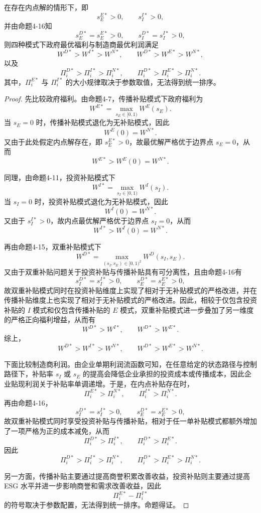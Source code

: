 \begin{proposition}[内点解情形下的福利与利润比较]
在存在内点解的情形下，即
\[
s_E^{E*}>0,\qquad s_I^{I*}>0,
\]
并由命题4-16知
\[
s_E^{D*}=s_E^{E*}>0,\qquad s_I^{D*}=s_I^{I*}>0,
\]
则四种模式下政府最优福利与制造商最优利润满足
\[
W^{D*}>W^{I*}>W^{N*},\qquad
W^{D*}>W^{E*}>W^{N*},
\]
以及
\[
\Pi_i^{D*}>\Pi_i^{I*}>\Pi_i^{N*},\qquad
\Pi_i^{D*}>\Pi_i^{E*}>\Pi_i^{N*}.
\]
其中，\(\Pi_i^{E*}\) 与 \(\Pi_i^{I*}\) 的大小规律取决于参数取值，无法得到统一排序。
\end{proposition}

\begin{proof}
先比较政府福利。由命题4-7，传播补贴模式下政府福利为
\[
W^{E*}=\max_{s_E\in[0,1)}W^E(s_E).
\]
当 \(s_E=0\) 时，传播补贴模式退化为无补贴模式，因此
\[
W^E(0)=W^{N*}.
\]
又由于此处假定内点解存在，即 \(s_E^{E*}>0\)，故最优解严格优于边界点 \(s_E=0\)，从而
\[
W^{E*}>W^E(0)=W^{N*}.
\]

同理，由命题4-11，投资补贴模式下
\[
W^{I*}=\max_{s_I\in[0,1)}W^I(s_I).
\]
当 \(s_I=0\) 时，投资补贴模式退化为无补贴模式，因此
\[
W^I(0)=W^{N*}.
\]
又由于 \(s_I^{I*}>0\)，故内点最优解严格优于边界点 \(s_I=0\)，从而
\[
W^{I*}>W^I(0)=W^{N*}.
\]

再由命题4-15，双重补贴模式下
\[
W^{D*}=\max_{(s_I,s_E)\in[0,1)^2}W^D(s_I,s_E).
\]
又由于双重补贴问题关于投资补贴与传播补贴具有可分离性，且由命题4-16有
\[
s_I^{D*}=s_I^{I*}>0,\qquad s_E^{D*}=s_E^{E*}>0,
\]
故双重补贴模式同时在投资补贴维度上实现了相对于无补贴模式的严格改进，并在传播补贴维度上也实现了相对于无补贴模式的严格改进。因此，相较于仅包含投资补贴的 \(I\) 模式和仅包含传播补贴的 \(E\) 模式，双重补贴模式进一步叠加了另一维度的严格正向福利增益，从而有
\[
W^{D*}>W^{I*},\qquad W^{D*}>W^{E*}.
\]
综上，
\[
W^{D*}>W^{I*}>W^{N*},\qquad
W^{D*}>W^{E*}>W^{N*}.
\]

下面比较制造商利润。由企业单期利润流函数可知，在任意给定的状态路径与控制路径下，补贴率 \(s_I\) 或 \(s_E\) 的提高会降低企业承担的投资成本或传播成本，因此企业贴现利润关于补贴率单调递增。于是，在内点补贴存在时，
\[
\Pi_i^{E*}>\Pi_i^{N*},\qquad
\Pi_i^{I*}>\Pi_i^{N*}.
\]
再由命题4-16，
\[
s_I^{D*}=s_I^{I*}>0,\qquad s_E^{D*}=s_E^{E*}>0,
\]
故双重补贴模式同时享受投资补贴与传播补贴，相对于任一单补贴模式都额外增加了一项严格为正的成本减免，从而
\[
\Pi_i^{D*}>\Pi_i^{I*},\qquad \Pi_i^{D*}>\Pi_i^{E*}.
\]
因此
\[
\Pi_i^{D*}>\Pi_i^{I*}>\Pi_i^{N*},\qquad
\Pi_i^{D*}>\Pi_i^{E*}>\Pi_i^{N*}.
\]

另一方面，传播补贴主要通过提高商誉积累改善收益，投资补贴则主要通过提高 ESG 水平并进一步影响商誉和需求改善收益，因此
\[
\Pi_i^{E*}-\Pi_i^{I*}
\]
的符号取决于参数配置，无法得到统一排序。命题得证。
\end{proof}


